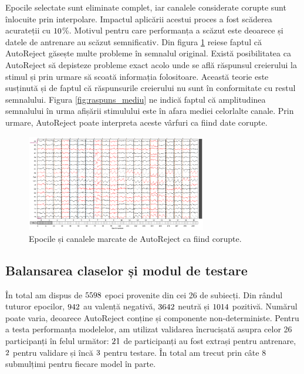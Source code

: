 Epocile selectate sunt eliminate complet, iar canalele considerate corupte sunt înlocuite prin interpolare. Impactul aplicării acestui proces a fost scăderea acurateții cu $10$\%. Motivul pentru care performanța a scăzut este deoarece și datele de antrenare au scăzut semnificativ. Din figura \ref{fig:autoreject} reiese faptul că AutoReject găsește multe probleme în semnalul original. Există posibilitatea ca AutoReject să depisteze probleme exact acolo unde se află răspunsul creierului la stimul și prin urmare să scoată informația folositoare. Această teorie este susținută și de faptul că răspunsurile creierului nu sunt în conformitate cu restul semnalului. Figura \ref{fig:raspuns_mediu} ne indică faptul că amplitudinea semnalului în urma afișării stimulului este în afara mediei celorlalte canale. Prin urmare, AutoReject poate interpreta aceste vârfuri ca fiind date corupte.

\vspace{1em}
\begin{figure}[H]
    \centering
		\vspace{-1em}
    \includegraphics[width=0.7\textwidth]{images/rezultat_autoreject.png}
    \caption{Epocile și canalele marcate de AutoReject ca fiind corupte.}
		\vspace{-1em}
    \label{fig:autoreject}
\end{figure}

\subsection{Balansarea claselor și modul de testare}

În total am dispus de $5598$ epoci provenite din cei 26 de subiecți. Din rândul tuturor epocilor, $942$ au valență negativă, $3642$ neutră și $1014$ pozitivă. Numărul poate varia, deoarece AutoReject conține și componente non-deterministe. Pentru a testa performanța modelelor, am utilizat validarea încrucișată asupra celor 26 participanți în felul următor: $21$ de participanți au fost extrași pentru antrenare, $2$ pentru validare și încă $3$ pentru testare. În total am trecut prin câte 8 submulțimi pentru fiecare model în parte.

